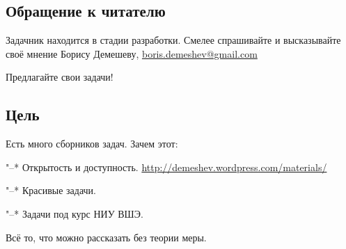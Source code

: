 


\subsection{Обращение к читателю}
Задачник находится в стадии разработки. Смелее спрашивайте и высказывайте
своё мнение Борису Демешеву, \href{mailto:boris.demeshev@gmail.com}{boris.demeshev@gmail.com}

Предлагайте свои задачи!


\subsection{Цель}
Есть много сборников задач. Зачем этот:

"--* Открытость и доступность. \url{http://demeshev.wordpress.com/materials/}

"--* Красивые задачи.

"--* Задачи под курс НИУ ВШЭ.

Всё то, что можно рассказать без теории меры.


